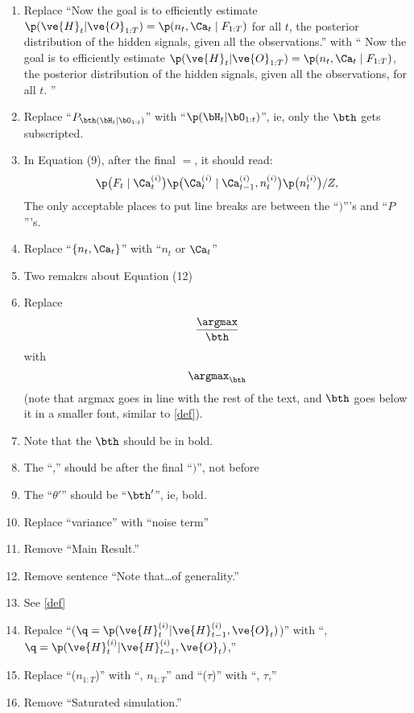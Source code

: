 \begin{enumerate}
\itb
\item Replace ``Now the goal is to efficiently estimate $\p(\ve{H}_t | \ve{O}_{1:T})=\p(n_t, \Ca_t \mid F_{1:T})$  for all $t$, the posterior distribution of the hidden signals, given all the observations.'' with `` Now the goal is to efficiently estimate $\p(\ve{H}_t | \ve{O}_{1:T})=\p(n_t, \Ca_t \mid F_{1:T})$, the posterior distribution of the hidden signals, given all the observations, for all $t$. ''
\item Replace ``$P_{\bth (\bH_t | \bO_{1:t})}$'' with ``$\p(\bH_t | \bO_{1:t})$'', ie, only the $\bth$ gets subscripted.
\item In Equation (9), after the final $=$, it should read: $$  \p \big( F_t \mid \Ca_t^{(i)} \big) \p \big( \Ca_t^{(i)}   \mid \Ca^{(i)}_{t-1}, n_t^{(i)} \big)  \p \big( n_t^{(i)} \big)/Z, $$  The only acceptable places to put line breaks are between the ``$)$'''s and ``$P$'''s.
\item Replace ``$\{n_t,\Ca_t\}$'' with ``$n_t$ or $\Ca_t$''
\item Two remakrs about Equation (12)
\ita
\item Replace $$\frac{\argmax}{\bth}$$ with $$\argmax_{\bth}$$ (note that argmax goes in line with the rest of the text, and $\bth$ goes below it in a smaller font, similar to \ref{def}).
\item Note that the $\bth$ should be in bold.
\item The ``,'' should be after the final ``$)$'', not before
\itb
\item The ``$\theta'$'' should be ``$\bth'$'', ie, bold.
\item Replace ``variance'' with ``noise term''
\item Remove ``Main Result.'' 
\item Remove sentence ``Note that\ldots of generality.''
\item See \ref{def}
\item Repalce ``($\q=\p(\ve{H}_t^{(i)} | \ve{H}_{t-1}^{(i)}, \ve{O}_t)$)'' with   ``, $\q=\p(\ve{H}_t^{(i)} | \ve{H}_{t-1}^{(i)}, \ve{O}_t)$,''
\item Replace ``($n_{1:T}$)'' with ``, $n_{1:T}$'' and ``($\tau$)'' with ``, $\tau$,''
\item Remove ``Saturated simulation.''
\end{enumerate}




















